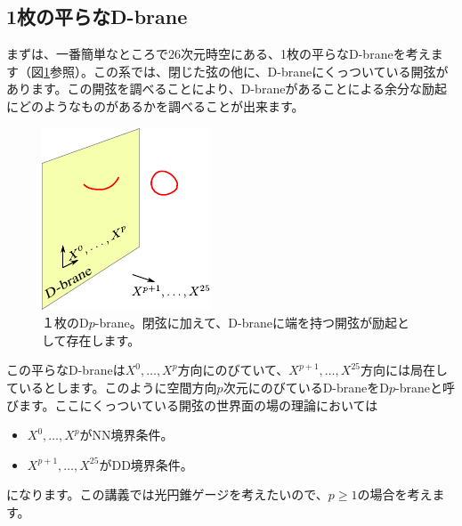 \documentclass[report,paper=a4, fontsize=12pt, line_length=16cm, number_of_lines=33,dvipdfmx]{jlreq}
\numberwithin{equation}{chapter}
\numberwithin{equation}{section}
\begin{document}
\subsection{1枚の平らなD-brane}
まずは、一番簡単なところで26次元時空にある、1枚の平らなD-braneを考えます（図\ref{fig:singlebrane}参照）。この系では、閉じた弦の他に、D-braneにくっついている開弦があります。この開弦を調べることにより、D-braneがあることによる余分な励起にどのようなものがあるかを調べることが出来ます。
\begin{figure}
  \centering
  \includegraphics[scale=1.5]{singlebrane.pdf}
  \caption{１枚のD$p$-brane。閉弦に加えて、D-braneに端を持つ開弦が励起として存在します。}
  \label{fig:singlebrane}
\end{figure}


この平らなD-braneは$X^0,\dots,X^{p}$方向にのびていて、$X^{p+1},\dots,X^{25}$方向には局在しているとします。このように空間方向$p$次元にのびているD-braneをD$p$-braneと呼びます。ここにくっついている開弦の世界面の場の理論においては
\begin{itemize}
  \item $X^0,\dots,X^{p}$がNN境界条件。
  \item $X^{p+1},\dots,X^{25}$がDD境界条件。
\end{itemize}
になります。この講義では光円錐ゲージを考えたいので、$p\ge 1$の場合を考えます。
\end{document}
